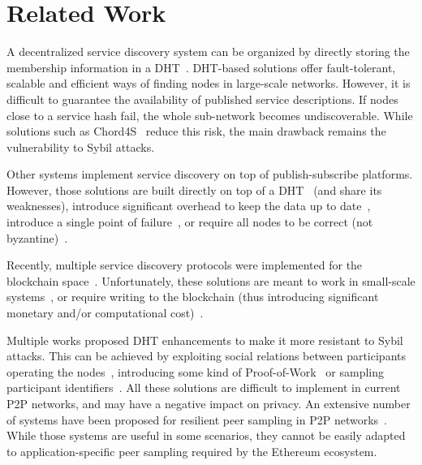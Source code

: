 
\section{Related Work}
\label{sec:related}

 

A decentralized service discovery system can be organized by directly storing the membership information in a DHT~\cite{can,chord,rowstron2001pastry,maymounkov2002kademlia}. 
DHT-based solutions offer fault-tolerant, scalable and efficient ways of finding nodes in large-scale networks.
However, it is difficult to guarantee the availability of published service descriptions.
If nodes close to a service hash fail, the whole sub-network becomes undiscoverable. 
While solutions such as Chord4S~\cite{chord4s} reduce this risk, the main drawback remains the vulnerability to Sybil attacks.

Other systems implement service discovery on top of publish-subscribe platforms.
However, those solutions are built directly on top of a DHT~\cite{scribe,poldercast,banno2015} (and share its weaknesses), introduce significant overhead to keep the data up to date~\cite{gossipsub}, introduce a single point of failure~\cite{dan2012centralized}, or require all nodes to be correct (\ie not byzantine)~\cite{baldoni2007tera}.

Recently, multiple service discovery protocols were implemented for the blockchain space~\cite{farmer2021decentralized, manevich2019endorsement, keizer2021flock}.
Unfortunately, these solutions are meant to work in small-scale systems~\cite{farmer2021decentralized}, or require writing to the blockchain (thus introducing significant monetary and/or computational cost)~\cite{manevich2019endorsement, keizer2021flock}. 

Multiple works proposed DHT enhancements to make it more resistant to Sybil attacks.
This can be achieved by exploiting social relations between participants operating the nodes~\cite{danezis2005sybil, danezis2009sybilinfer}, introducing some kind of Proof-of-Work~\cite{skad} or sampling participant identifiers~\cite{cholez2010efficient}.
All these solutions are difficult to implement in current P2P networks, and may have a negative impact on privacy.
An extensive number of systems have been proposed for resilient peer sampling in P2P networks~\cite{bortnikov2009brahms, jelasity2007gossip, ouguz2014stable, pigaglio2022raptee}.
While those systems are useful in some scenarios, they cannot be easily adapted to application-specific peer sampling required by the Ethereum ecosystem.

